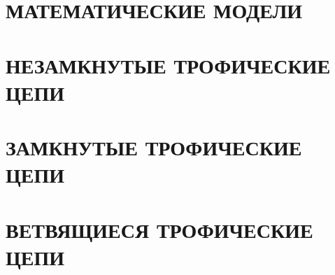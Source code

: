 \documentclass[
    14pt, 
    a4paper, 
    titlepage, 
    fleqn
]{extarticle}
\begin{document}
    
    \pagebreak

    
    \pagebreak

    \tableofcontents

    \pagebreak

    
    
    \pagebreak

    \section{МАТЕМАТИЧЕСКИЕ МОДЕЛИ}
    

    \pagebreak

    

    \pagebreak

    \section{НЕЗАМКНУТЫЕ ТРОФИЧЕСКИЕ ЦЕПИ}
    

    \pagebreak

    

    \pagebreak

    \section{ЗАМКНУТЫЕ ТРОФИЧЕСКИЕ ЦЕПИ}
    

    \pagebreak

    
    
    \pagebreak

    \section{ВЕТВЯЩИЕСЯ ТРОФИЧЕСКИЕ ЦЕПИ}
    

    \pagebreak

    

    \pagebreak

    

    \pagebreak

    

    
\end{document}
